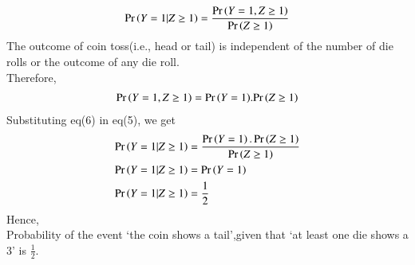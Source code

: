 \documentclass[journal,12pt,twocolumn]{IEEEtran}
\begin{document}
\begin{align}
    \Pr\left(Y=1|Z\geq 1\right)=\frac{\Pr\left(Y=1,Z\geq 1\right)}{\Pr\left(Z \geq 1\right)}
\end{align}
The outcome of coin toss(i.e., head or tail) is independent of the number of die rolls or the outcome of any die roll.
\\Therefore,
\begin{align}
       \Pr\left(Y=1,Z\geq 1\right)={\Pr\left(Y=1\right)}.{\Pr\left(Z\geq 1\right)}
\end{align}
Substituting eq(6) in eq(5), we get
\begin{align}
    \Pr\left(Y=1|Z\geq 1\right)&=\frac{\Pr\left(Y=1\right).\Pr\left(Z\geq 1\right)}{\Pr\left(Z \geq 1\right)}\\
    \Pr\left(Y=1|Z \geq 1\right) &= \Pr\left(Y=1\right)\\
    \Pr\left(Y=1|Z \geq 1\right) &= \frac{1}{2}
\end{align}
Hence,
\\Probability of the event `the coin shows a tail',given that `at least one die shows a 3' is $\frac{1}{2}$.
\end{document}

